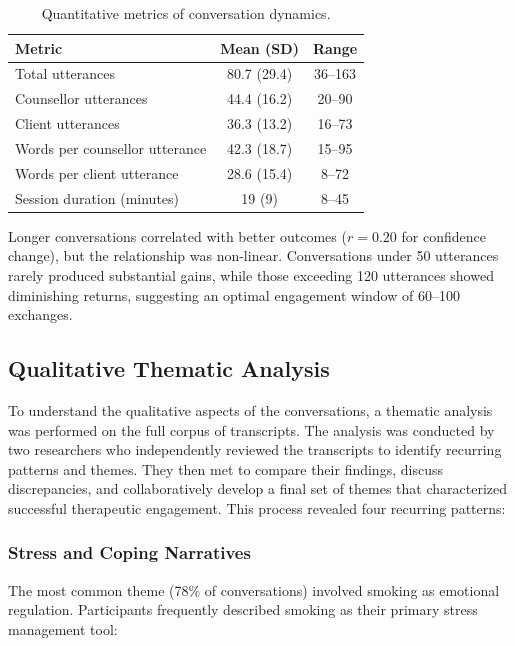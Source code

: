 \begin{table}[ht]
  \centering
  \small
  \setlength{\tabcolsep}{4pt}
  \renewcommand{\arraystretch}{1.1}
  \begin{tabular}{@{}lcc@{}}
    \toprule
    \textbf{Metric} & \textbf{Mean (SD)} & \textbf{Range} \\
    \midrule
    Total utterances & 80.7 (29.4) & 36--163 \\
    Counsellor utterances & 44.4 (16.2) & 20--90 \\
    Client utterances & 36.3 (13.2) & 16--73 \\
    Words per counsellor utterance & 42.3 (18.7) & 15--95 \\
    Words per client utterance & 28.6 (15.4) & 8--72 \\
    Session duration (minutes) & 19 (9) & 8--45 \\
    \bottomrule
  \end{tabular}
  \caption{Quantitative metrics of conversation dynamics.}
  \label{table:conversation_metrics}
\end{table}

Longer conversations correlated with better outcomes ($r=0.20$ for confidence change), but the relationship was non-linear. Conversations under 50 utterances rarely produced substantial gains, while those exceeding 120 utterances showed diminishing returns, suggesting an optimal engagement window of 60--100 exchanges.

\subsection{Qualitative Thematic Analysis}

To understand the qualitative aspects of the conversations, a thematic analysis was performed on the full corpus of transcripts. The analysis was conducted by two researchers who independently reviewed the transcripts to identify recurring patterns and themes. They then met to compare their findings, discuss discrepancies, and collaboratively develop a final set of themes that characterized successful therapeutic engagement. This process revealed four recurring patterns:

\subsubsection{Stress and Coping Narratives}

The most common theme (78\% of conversations) involved smoking as emotional regulation. Participants frequently described smoking as their primary stress management tool:

